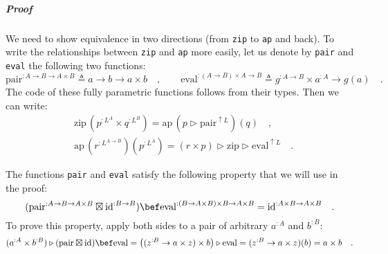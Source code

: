 \subparagraph{Proof}

We need to show equivalence in two directions (from \lstinline!zip!
to \lstinline!ap! and back). To write the relationships between \lstinline!zip!
and \lstinline!ap! more easily, let us denote by \lstinline!pair!
and \lstinline!eval! the following two functions:
\[
\text{pair}^{:A\rightarrow B\rightarrow A\times B}\triangleq a\rightarrow b\rightarrow a\times b\quad,\quad\quad\text{eval}^{:\left(A\rightarrow B\right)\times A\rightarrow B}\triangleq g^{:A\rightarrow B}\times a^{:A}\rightarrow g(a)\quad.
\]
The code of these fully parametric functions follows from their types.
Then we can write:
\begin{align*}
 & \text{zip}\,(p^{:L^{A}}\times q^{:L^{B}})=\text{ap}\,(p\triangleright\text{pair}^{\uparrow L})(q)\quad,\\
 & \text{ap}\,(r^{:L^{A\rightarrow B}})(p^{:L^{A}})=(r\times p)\triangleright\text{zip}\triangleright\text{eval}^{\uparrow L}\quad.
\end{align*}

The functions \lstinline!pair! and \lstinline!eval! satisfy the
following property that we will use in the proof:
\begin{equation}
(\text{pair}^{:A\rightarrow B\rightarrow A\times B}\boxtimes\text{id}^{:B\rightarrow B})\bef\text{eval}^{:\left(B\rightarrow A\times B\right)\times B\rightarrow A\times B}=\text{id}^{:A\times B\rightarrow A\times B}\quad.\label{eq:pair-and-eval-property-derivation1}
\end{equation}
To prove this property, apply both sides to a pair of arbitrary $a^{:A}$
and $b^{:B}$:
\[
(a^{:A}\times b^{:B})\triangleright(\text{pair}\boxtimes\text{id})\bef\text{eval}=\big((z^{:B}\rightarrow a\times z)\times b\big)\triangleright\text{eval}=(z^{:B}\rightarrow a\times z)(b)=a\times b\quad.
\]

